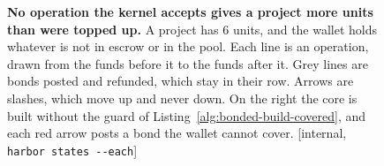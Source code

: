 \begin{figure}[H]
\caption{\textbf{No operation the kernel accepts gives a project more
units than were topped up.} A project has 6 units, and the wallet holds
whatever is not in escrow or in the pool. Each line is an operation, drawn
from the funds before it to the funds after it. Grey lines are bonds
posted and refunded, which stay in their row. Arrows are slashes, which
move up and never down. On the right the core is built without the guard
of Listing~\ref{alg:bonded-build-covered}, and each red arrow posts a bond
the wallet cannot cover. [internal, \texttt{harbor states -{}-each}]}
\label{fig:bonded-moves}
\end{figure}
